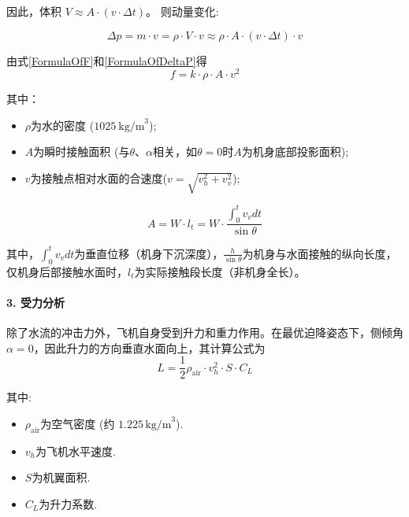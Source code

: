 \documentclass{cumcmthesis}
\begin{document}
    因此，体积 $V \approx A \cdot (v \cdot \Delta t)$。 
    则动量变化: 
    
    \begin{equation}
    \Delta p = m \cdot v = \rho \cdot V \cdot v \approx 
    \rho \cdot A \cdot (v \cdot \Delta t) \cdot v 
    \label{FormulaOfDeltaP}
    \end{equation}

    由式\eqref{FormulaOfF}和\eqref{FormulaOfDeltaP}得
    \begin{equation}
    f = k \cdot \rho \cdot A \cdot v^2 
    \label{TheFnalF}
    \end{equation}

    其中：
\begin{itemize}

\item $\rho$为水的密度 ($1025\ \text{kg/m}^3$);

\item $A$为瞬时接触面积 (与$\theta$、$\alpha$相关，如$\theta=0$时$A$为机身底部投影面积); 

\item $v$为接触点相对水面的合速度($v=\sqrt{v_h^2 + v_v^2}$);

\end{itemize}


\begin{equation}
    A = W \cdot l_t = W \cdot \frac {\int_{0}^{t} v_v dt}{\sin\theta}
    \label{FormulaOfA}
\end{equation}

其中，$\int_{0}^{t} v_v dt$为垂直位移（机身下沉深度），$\frac{h}{\sin\theta}$为机身与水面接触的纵向长度，仅机身后部接触水面时，$l_t$为实际接触段长度（非机身全长）。


\paragraph{3. 受力分析}

除了水流的冲击力外，飞机自身受到升力和重力作用。在最优迫降姿态下，侧倾角$\alpha = 0 $，因此升力的方向垂直水面向上，其计算公式为
\begin{equation}
    L = \frac{1}{2} \rho_{\text{air}} \cdot v_h^2 \cdot S \cdot C_L
    \label{FormulaOfL}
\end{equation}

其中:  
\begin{itemize}
    \item $\rho_{\text{air}}$为空气密度 (约 $1.225 \, \text{kg/m}^3$).   
    \item $v_h$为飞机水平速度.   
    \item $S$为机翼面积.   
    \item $C_L$为升力系数.   
\end{itemize}
\end{document}
